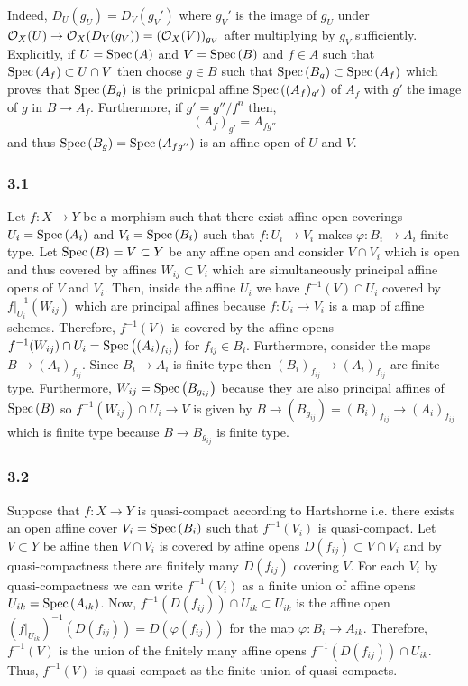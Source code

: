 \documentclass[12pt]{article}
\begin{document}
\begin{rmk}
Indeed, $D_U(g_U) = D_V(g_{V}')$ where $g_V'$ is the image of $g_U$ under $\mathcal{O}_{X}(U) \to \mathcal{O}_{X}(D_V(g_V)) = (\mathcal{O}_{X}(V))_{g_V}$ after multiplying by $g_V$ sufficiently. Explicitly, if $U = \mathrm{Spec}\left( A \right)$ and $V = \mathrm{Spec}\left( B \right)$ and $f \in A$ such that $\mathrm{Spec}\left( A_f \right) \subset U \cap V$ then choose $g \in B$ such that $\mathrm{Spec}\left( B_g \right) \subset \mathrm{Spec}\left( A_f \right)$ which proves that $\mathrm{Spec}\left( B_g \right)$ is the prinicpal affine $\mathrm{Spec}\left( (A_f)_{g'} \right)$ of $A_f$ with $g'$ the image of $g$ in $B \to A_f$. Furthermore, if $g' = g'' / f^n$ then,
\[ (A_f)_{g'} = A_{fg''} \]
and thus $\mathrm{Spec}\left( B_g \right) = \mathrm{Spec}\left( A_{fg''} \right)$ is an affine open of $U$ and $V$.
\end{rmk}

\subsubsection{3.1}

Let $f : X \to Y$ be a morphism such that there exist affine open coverings $U_i = \mathrm{Spec}\left( A_i \right)$ and $V_i = \mathrm{Spec}\left( B_i \right)$ such that $f : U_i \to V_i$ makes $\varphi : B_i \to A_i$ finite type. Let $\mathrm{Spec}\left( B \right) = V \subset Y$ be any affine open and consider $V \cap V_i$ which is open and thus covered by affines $W_{ij} \subset V_i$ which are simultaneously principal affine opens of $V$ and $V_i$. Then, inside the affine $U_i$ we have $f^{-1}(V) \cap U_i$ covered by $f|_{U_i}^{-1}(W_{ij})$ which are principal affines because $f : U_i \to V_i$ is a map of affine schemes. Therefore, $f^{-1}(V)$ is covered by the affine opens $f^{-1}(W_{ij}) \cap U_i = \mathrm{Spec}\left( (A_i)_{f_{ij}} \right)$ for $f_{ij} \in B_i$. Furthermore, consider the maps $B \to (A_i)_{f_{ij}}$. Since $B_i \to A_i$ is finite type then $(B_i)_{f_{ij}} \to (A_i)_{f_{ij}}$ are finite type. Furthermore, $W_{ij} = \mathrm{Spec}\left( B_{g_{ij}} \right)$ because they are also principal affines of $\mathrm{Spec}\left( B \right)$ so $f^{-1}(W_{ij}) \cap U_i \to V$ is given by $B \to (B_{g_{ij}}) = (B_i)_{f_{ij}} \to (A_i)_{f_{ij}}$ which is finite type because $B \to B_{g_{ij}}$ is finite type. 

\subsubsection{3.2}

Suppose that $f : X \to Y$ is quasi-compact according to Hartshorne i.e. there exists an open affine cover $V_i = \mathrm{Spec}\left( B_i \right)$ such that $f^{-1}(V_i)$ is quasi-compact. Let $V \subset Y$ be affine then $V \cap V_i$ is covered by affine opens $D(f_{ij}) \subset V \cap V_i$ and by quasi-compactness there are finitely many $D(f_{ij})$ covering $V$. For each $V_i$ by quasi-compactness we can write $f^{-1}(V_i)$ as a finite union of affine opens $U_{ik} = \mathrm{Spec}\left( A_{ik} \right)$. Now, $f^{-1}(D(f_{ij}) ) \cap U_{ik} \subset U_{ik}$ is the affine open $(f|_{U_{ik}})^{-1}(D(f_{ij})) = D(\varphi(f_{ij}))$ for the map $\varphi : B_i \to A_{ik}$. Therefore, $f^{-1}(V)$ is the union of the finitely many affine opens $f^{-1}(D(f_{ij})) \cap U_{ik}$. Thus, $f^{-1}(V)$ is quasi-compact as the finite union of quasi-compacts.
\end{document}

